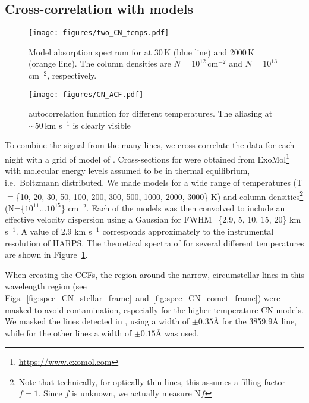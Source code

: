 \documentclass{aa}
\newcommand{\kms}{km s$^{-1}$}
\begin{document}
\subsection{Cross-correlation with \texorpdfstring{}{CN} models}\label{sect:CCF}

\begin{figure}
    \begin{centering}
        \texttt{[image: figures/two\_CN\_temps.pdf]}
        \caption{Model absorption spectrum for  at 30\,K (blue line) and 2000\,K (orange line). The  column densities are $N=10^{12}$\,cm$^{-2}$ and $N=10^{13}$\,cm$^{-2}$, respectively. }
        \label{fig:CN_theory}
    \end{centering}
\end{figure}

\begin{figure}
    \begin{centering}
        \texttt{[image: figures/CN\_ACF.pdf]}
        \caption{ autocorrelation function for different temperatures. The aliasing at $\sim50$\,\kms{} is clearly visible}
        \label{fig:CN_ACF}
    \end{centering}
\end{figure}

To combine the signal from the many  lines, we cross-correlate the data for each night with a grid of model of .
%
Cross-sections for  were obtained from ExoMol\footnote{\url{https://www.exomol.com}} \citep{Tennyson12,Tennyson16,Brooke14} with molecular energy levels assumed to be in thermal equilibrium, i.e.\ Boltzmann distributed.
%
We made models for a wide range of temperatures (T$=$\{10, 20, 30, 50, 100, 200, 300, 500, 1000, 2000, 3000\} K) and column densities\footnote{Note that technically, for optically thin lines, this assumes a filling factor $f=1$.
%
Since $f$ is unknown, we actually measure N$f$} (N=\{$10^{11} \ldots 10^{15}$\} cm$^{-2}$.
%
Each of the models was then convolved to include an effective velocity dispersion using a Gaussian for FWHM=\{2.9, 5, 10, 15, 20\} \kms{}.
%
A value of 2.9 \kms{} corresponds approximately to the instrumental resolution of HARPS.
%
The theoretical spectra of  for several different temperatures are shown in Figure~\ref{fig:CN_theory}.

When creating the CCFs, the region around the narrow, circumstellar  lines in this wavelength region (see Figs.~\ref{fig:spec_CN_stellar_frame}~and~\ref{fig:spec_CN_comet_frame}) were masked to avoid contamination, especially for the higher temperature CN models.
%
We masked the lines detected in \citep{Kiefer2018}, using a width of $\pm0.35$\AA{} for the  3859.9\AA{} line, while for the other lines a width of $\pm0.15$\AA{} was used.
\end{document}
